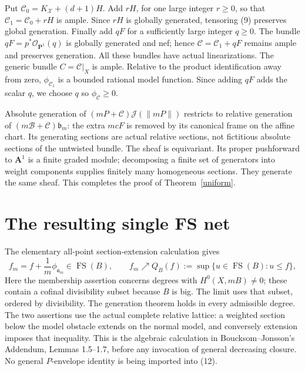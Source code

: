 \documentclass[10pt]{article}
\newcommand{\FS}{\operatorname{FS}}
\newcommand{\J}{\mathcal J}
\newcommand{\OO}{\mathcal O}
\begin{document}
Put $\mathcal C_0=K_{\mathcal X}+(d+1)H$. Add $rH$, for one large
integer $r\geq0$, so that $\mathcal C_1=\mathcal C_0+rH$ is ample.
Since $rH$ is globally generated, tensoring (9) preserves global
generation. Finally add $qF$ for a sufficiently large integer $q\geq0$.
The bundle $qF=p^*\OO_{\mathbf P^1}(q)$ is globally generated and
nef; hence $\mathcal C=\mathcal C_1+qF$ remains ample and preserves
generation. All these bundles have actual linearizations. The generic
bundle $C=\mathcal C|_X$ is ample. Relative to the product identification
away from zero, $\phi_{\mathcal C_1}$ is a bounded rational model
function. Since adding $qF$ adds the scalar $q$, we choose $q$ so
$\phi_{\mathcal C}\geq0$.

Absolute generation of $(mP+\mathcal C)\J(\|mP\|)$ restricts to
relative generation of $(m\mathcal B+\mathcal C)\mathfrak b_m$:
the extra $mcF$ is removed by its canonical frame on the affine chart.
Its generating sections are actual relative sections, not fictitious
absolute sections of the untwisted bundle. The sheaf is equivariant.
Its proper pushforward to $\mathbf A^1$ is a finite graded module;
decomposing a finite set of generators into weight components supplies
finitely many homogeneous sections. They generate the same sheaf.
This completes the proof of Theorem~\ref{uniform}.

\section{The resulting single FS net}
The elementary all-point section-extension calculation gives
\[
 f_m=f+\frac1m\phi_{\mathfrak a_m}\in\FS(B),\qquad
 f_m\nearrow Q_B(f):=\sup\{u\in\FS(B):u\leq f\},        \tag{12}
\]
Here the membership assertion concerns degrees with $H^0(X,mB)\ne0$;
these contain a cofinal divisibility subset because $B$ is big. The
limit uses that subset, ordered by divisibility. The generation theorem
holds in every admissible degree. The two assertions use the actual
complete relative lattice: a weighted section below the model
obstacle extends on the normal model, and conversely extension
imposes that inequality. This is the algebraic calculation in
Boucksom--Jonsson's Addendum, Lemmas 1.5--1.7, before any invocation
of general decreasing closure. No general $P$-envelope identity is
being imported into (12).
\end{document}
